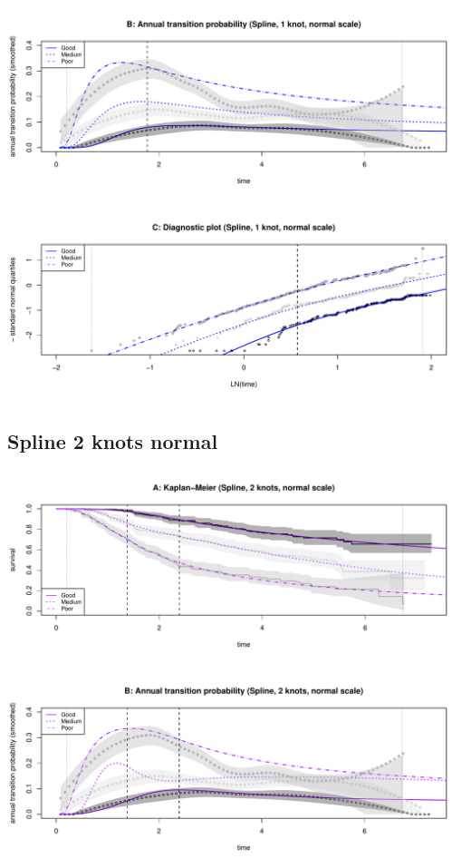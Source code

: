 \documentclass[]{article}
\begin{document}
\begin{flushleft}\includegraphics[height=0.25\textheight]{Images/spline_norm1-2} \end{flushleft}

\begin{flushleft}\includegraphics[height=0.25\textheight]{Images/spline_norm1-3} \end{flushleft}

\newpage

\subsection{Spline 2 knots normal}\label{spline-2-knots-normal}

\begin{flushleft}\includegraphics[height=0.25\textheight]{Images/spline_norm2-1} \end{flushleft}

\begin{flushleft}\includegraphics[height=0.25\textheight]{Images/spline_norm2-2} \end{flushleft}
\end{document}
